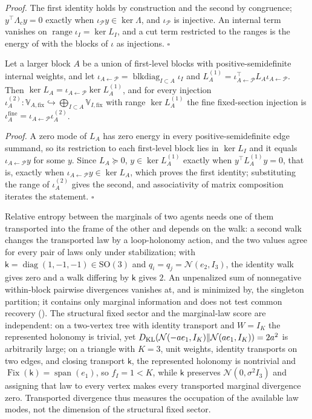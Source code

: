 \noindent\emph{Proof.}
The first identity holds by construction and the second by congruence; $y^\top\Lambda_cy=0$ exactly when
$\iota_{\mathcal P}y\in\ker\Lambda$, and $\iota_{\mathcal P}$ is injective. An internal term vanishes on
$\operatorname{range}\iota_I=\ker L_I$, and a cut term restricted to the ranges is the energy of
 with the blocks of $\iota$ as injections. $\square$

Let a larger block $A$ be a union of first-level blocks with positive-semidefinite internal weights, and
let $\iota_{A\leftarrow\mathcal P}=\operatorname{blkdiag}_{I\subset A}\iota_I$ and
$L^{(1)}_A=\iota_{A\leftarrow\mathcal P}^\top L_A\iota_{A\leftarrow\mathcal P}$. Then
$\ker L_A=\iota_{A\leftarrow\mathcal P}\ker L^{(1)}_A$, and for every injection
$\iota^{(2)}_A:\mathbb V_{A,\mathrm{fix}}\hookrightarrow\bigoplus_{I\subset A}\mathbb V_{I,\mathrm{fix}}$ with range $\ker L^{(1)}_A$ the fine
fixed-section injection is $\iota^{\mathrm{fine}}_A=\iota_{A\leftarrow\mathcal P}\iota^{(2)}_A$.

\noindent\emph{Proof.}
A zero mode of $L_A$ has zero energy in every positive-semidefinite edge summand, so its restriction to each
first-level block lies in $\ker L_I$ and it equals $\iota_{A\leftarrow\mathcal P}y$ for some $y$. Since
$L_A\succeq0$, $y\in\ker L^{(1)}_A$ exactly when $y^\top L^{(1)}_Ay=0$, that is, exactly when
$\iota_{A\leftarrow\mathcal P}y\in\ker L_A$, which proves the first identity; substituting the range of
$\iota^{(2)}_A$ gives the second, and associativity of matrix composition iterates the statement.
$\square$

Relative entropy between the marginals of two agents needs one of them transported into the frame of the
other and depends on the walk: a second walk changes the transported law by a loop-holonomy action, and
the two values agree for every pair of laws only under stabilization; with
$\mathsf k=\operatorname{diag}(1,-1,-1)\in\mathrm{SO}(3)$ and $q_i=q_j=\mathcal N(e_2,I_3)$, the identity walk
gives zero and a walk differing by $\mathsf k$ gives $2$. An unpenalized sum of nonnegative within-block
pairwise divergences vanishes at, and is minimized by, the singleton partition; it contains only marginal
information and does not test common recovery (). The structural fixed
sector and the marginal-law score are independent: on a two-vertex tree with identity transport and
$W=I_K$ the represented holonomy is trivial, yet $D_{\mathrm{KL}}(\mathcal N(-ae_1,I_K)\Vert\mathcal N(ae_1,I_K))=2a^2$ is
arbitrarily large; on a triangle with $K=3$, unit weights, identity transports on two edges, and closing
transport $\mathsf k$, the represented holonomy is nontrivial and
$\operatorname{Fix}(\mathsf k)=\operatorname{span}(e_1)$, so $f_I=1<K$, while $\mathsf k$ preserves
$\mathcal N(0,\sigma^2I_3)$ and assigning that law to every vertex makes every transported marginal
divergence zero. Transported divergence thus measures the occupation of the available law modes, not the
dimension of the structural fixed sector. 

